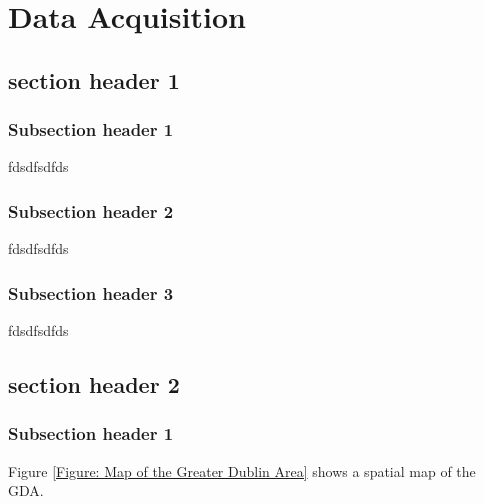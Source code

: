 
\chapter{Data Acquisition} \label{sec:Data_Acquisition}

\section{section header 1}

\subsection{Subsection header 1}
fdsdfsdfds
\subsection{Subsection header 2}
fdsdfsdfds
\subsection{Subsection header 3}
fdsdfsdfds

\section{section header 2}

\subsection{Subsection header 1}

Figure \ref{Figure: Map of the Greater Dublin Area} shows a spatial map of the
GDA.

